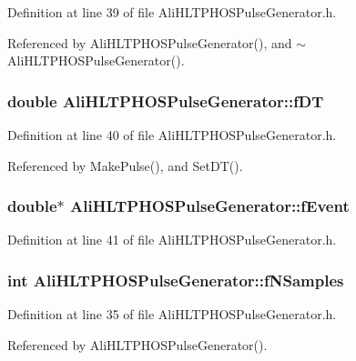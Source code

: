 Definition at line 39 of file Ali\-HLTPHOSPulse\-Generator.h.

Referenced by Ali\-HLTPHOSPulse\-Generator(), and $\sim$Ali\-HLTPHOSPulse\-Generator().
\subsubsection{\setlength{\rightskip}{0pt plus 5cm}double {\bf Ali\-HLTPHOSPulse\-Generator::f\-DT}\hspace{0.3cm}{\tt  [private]}}\label{classAliHLTPHOSPulseGenerator_AliHLTPHOSPulseGeneratorr6}




Definition at line 40 of file Ali\-HLTPHOSPulse\-Generator.h.

Referenced by Make\-Pulse(), and Set\-DT().
\subsubsection{\setlength{\rightskip}{0pt plus 5cm}double$\ast$ {\bf Ali\-HLTPHOSPulse\-Generator::f\-Event}\hspace{0.3cm}{\tt  [private]}}\label{classAliHLTPHOSPulseGenerator_AliHLTPHOSPulseGeneratorr7}




Definition at line 41 of file Ali\-HLTPHOSPulse\-Generator.h.
\subsubsection{\setlength{\rightskip}{0pt plus 5cm}int {\bf Ali\-HLTPHOSPulse\-Generator::f\-NSamples}\hspace{0.3cm}{\tt  [private]}}\label{classAliHLTPHOSPulseGenerator_AliHLTPHOSPulseGeneratorr1}




Definition at line 35 of file Ali\-HLTPHOSPulse\-Generator.h.

Referenced by Ali\-HLTPHOSPulse\-Generator().
